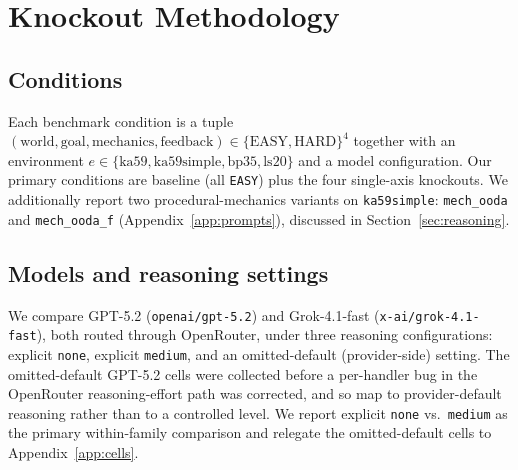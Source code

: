 \documentclass{article}
\begin{document}
\section{Knockout Methodology}
\label{sec:method}
\subsection{Conditions}
Each benchmark condition is a tuple $(\text{world}, \text{goal}, \text{mechanics}, \text{feedback}) \in \{\text{EASY}, \text{HARD}\}^4$ together with an environment $e \in \{\text{ka59}, \text{ka59simple}, \text{bp35}, \text{ls20}\}$ and a model configuration. Our primary conditions are baseline (all \texttt{EASY}) plus the four single-axis knockouts. We additionally report two procedural-mechanics variants on \texttt{ka59simple}: \texttt{mech\_ooda} and \texttt{mech\_ooda\_f} (Appendix~\ref{app:prompts}), discussed in Section~\ref{sec:reasoning}.

\subsection{Models and reasoning settings}
We compare GPT-5.2 (\texttt{openai/gpt-5.2}) and Grok-4.1-fast (\texttt{x-ai/grok-4.1-fast}), both routed through OpenRouter, under three reasoning configurations: explicit \texttt{none}, explicit \texttt{medium}, and an omitted-default (provider-side) setting. The omitted-default GPT-5.2 cells were collected before a per-handler bug in the OpenRouter reasoning-effort path was corrected, and so map to provider-default reasoning rather than to a controlled level. We report explicit \texttt{none} vs.\ \texttt{medium} as the primary within-family comparison and relegate the omitted-default cells to Appendix~\ref{app:cells}.
\end{document}
